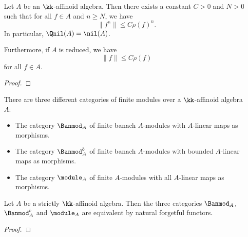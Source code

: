     \begin{proposition}\label{prop:the_norm_on_affinoid_is_bounded_by_spectral_radius}
        Let \(A\) be an \(\kk\)-affinoid algebra.
        Then there exists a constant \(C > 0\) and \(N > 0\) such that for all \(f \in A\) and \(n \geq N\), we have
        \[
            \|f^n\| \leq C \rho(f)^n.   
        \]
        In particular, \(\Qnil(A) = \nil(A)\).

        Furthermore, if \(A\) is reduced, we have 
        \[
            \|f\| \leq C \rho(f)
        \]
        for all \(f \in A\).
    \end{proposition}
    \begin{proof}
    \end{proof}

    There are three different categories of finite modules over a \(\kk\)-affinoid algebra \(A\):
    \begin{itemize}
        \item The category \(\Banmod_A\) of finite banach \(A\)-modules with \(A\)-linear maps as morphisms.
        \item The category \(\Banmod_A^b\) of finite banach \(A\)-modules with bounded \(A\)-linear maps as morphisms.
        \item The category \(\module_A\) of finite \(A\)-modules with all \(A\)-linear maps as morphisms.
    \end{itemize}

    \begin{theorem}\label{thm:strictly_affinoid_algebra_equivalent_of_categroy_of_finite_banach_module_and_algebraic_module}
        Let \(A\) be a strictly \(\kk\)-affinoid algebra.
        Then the three categories \(\Banmod_A\), \(\Banmod_A^b\) and \(\module_A\) are equivalent by natural forgetful functors.
    \end{theorem}
    \begin{proof}
    \end{proof}








